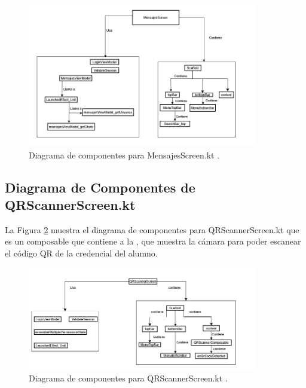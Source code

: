 \begin{figure}[htbp!]
	\begin{center}
		\includegraphics[width=0.9\textwidth]{DiagramasMoviles/DCM (28)}
		\caption{Diagrama de componentes para MensajesScreen.kt .}
		\label{fig:Componentes_15}
	\end{center}
\end{figure}

\newpage

\subsection{Diagrama de Componentes de QRScannerScreen.kt}

La Figura \ref{fig:Componentes_16} muestra el diagrama de componentes para QRScannerScreen.kt que es un composable que contiene a la , que muestra la cámara para poder escanear el código QR de la credencial del alumno.

\begin{figure}[htbp!]
	\begin{center}
		\includegraphics[width=0.9\textwidth]{DiagramasMoviles/DCM (29)}
		\caption{Diagrama de componentes para QRScannerScreen.kt .}
		\label{fig:Componentes_16}
	\end{center}
\end{figure}

